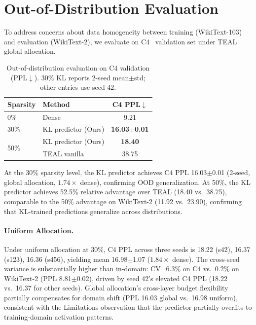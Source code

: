 \section{Out-of-Distribution Evaluation}
\label{app:ood}

To address concerns about data homogeneity between training (WikiText-103) and evaluation (WikiText-2), we evaluate on C4~\cite{raffel2020c4} validation set under TEAL global allocation.

\begin{table}[h]
\centering
\caption{Out-of-distribution evaluation on C4 validation (PPL$\downarrow$). 30\% KL reports 2-seed mean$\pm$std; other entries use seed 42.}
\label{tab:ood}
\small
\begin{tabular}{llc}
\toprule
Sparsity & Method & C4 PPL$\downarrow$ \\
\midrule
0\% & Dense & 9.21 \\
\midrule
30\% & KL predictor (Ours) & \textbf{16.03$\pm$0.01} \\ %
\midrule
\multirow{2}{*}{50\%} & KL predictor (Ours) & \textbf{18.40} \\ %
& TEAL vanilla & 38.75 \\
\bottomrule
\end{tabular}
\end{table}

At the 30\% sparsity level, the KL predictor achieves C4 PPL 16.03$\pm$0.01 (2-seed, global allocation, $1.74\times$ dense), confirming OOD generalization.
At 50\%, the KL predictor achieves 52.5\% relative advantage over TEAL (18.40 vs.\ 38.75), comparable to the 50\% advantage on WikiText-2 (11.92 vs.\ 23.90), confirming that KL-trained predictions generalize across distributions.

\paragraph{Uniform Allocation.}
Under uniform allocation at 30\%, C4 PPL across three seeds is 18.22 (s42), 16.37 (s123), 16.36 (s456), yielding mean 16.98$\pm$1.07 ($1.84\times$ dense). %
The cross-seed variance is substantially higher than in-domain: CV=6.3\% on C4 vs.\ 0.2\% on WikiText-2 (PPL 8.81$\pm$0.02), driven by seed 42's elevated C4 PPL (18.22 vs.\ 16.37 for other seeds).
Global allocation's cross-layer budget flexibility partially compensates for domain shift (PPL 16.03 global vs.\ 16.98 uniform), consistent with the Limitations observation that the predictor partially overfits to training-domain activation patterns.


